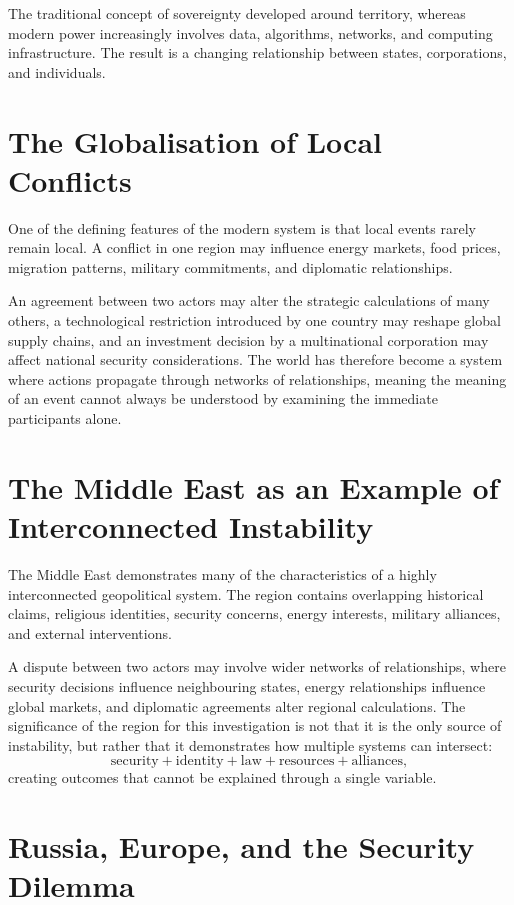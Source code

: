 \documentclass[11pt,openany]{book}
\theoremstyle{plain}
\theoremstyle{definition}
\begin{document}
The traditional concept of sovereignty developed around territory, whereas modern power increasingly involves data, algorithms, networks, and computing infrastructure. The result is a changing relationship between states, corporations, and individuals.

\section*{The Globalisation of Local Conflicts}

One of the defining features of the modern system is that local events rarely remain local. A conflict in one region may influence energy markets, food prices, migration patterns, military commitments, and diplomatic relationships.

An agreement between two actors may alter the strategic calculations of many others, a technological restriction introduced by one country may reshape global supply chains, and an investment decision by a multinational corporation may affect national security considerations. The world has therefore become a system where actions propagate through networks of relationships, meaning the meaning of an event cannot always be understood by examining the immediate participants alone.

\section*{The Middle East as an Example of Interconnected Instability}

The Middle East demonstrates many of the characteristics of a highly interconnected geopolitical system. The region contains overlapping historical claims, religious identities, security concerns, energy interests, military alliances, and external interventions.

A dispute between two actors may involve wider networks of relationships, where security decisions influence neighbouring states, energy relationships influence global markets, and diplomatic agreements alter regional calculations. The significance of the region for this investigation is not that it is the only source of instability, but rather that it demonstrates how multiple systems can intersect:
\[
\text{security}
+
\text{identity}
+
\text{law}
+
\text{resources}
+
\text{alliances},
\]
creating outcomes that cannot be explained through a single variable.

\section*{Russia, Europe, and the Security Dilemma}
\end{document}
